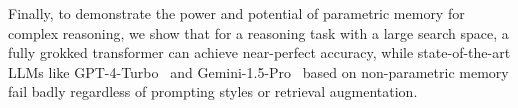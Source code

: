 Finally, to demonstrate the power and potential of parametric memory for complex reasoning, we show that for a reasoning task with a large search space, a fully grokked transformer can achieve near-perfect accuracy, while state-of-the-art LLMs like GPT-4-Turbo~\citep{openai_devday_2023} and Gemini-1.5-Pro~\citep{google2024gemini} based on non-parametric memory fail badly regardless of prompting styles or retrieval augmentation.